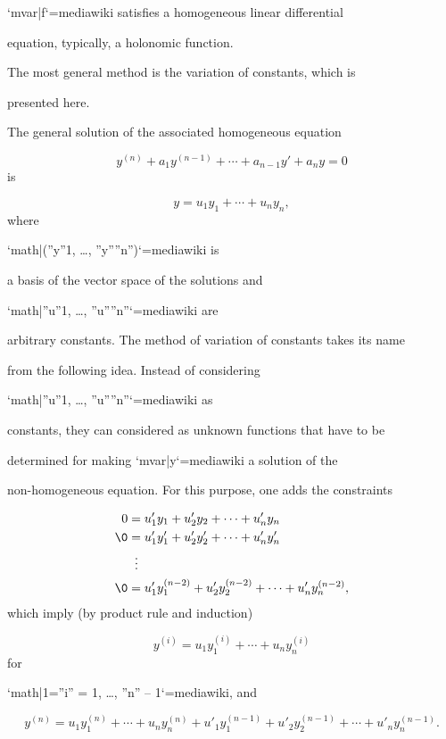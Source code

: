 `{{mvar|f}}`{=mediawiki} satisfies a homogeneous linear differential

equation, typically, a holonomic function.



The most general method is the variation of constants, which is

presented here.



The general solution of the associated homogeneous equation



$$y^{(n)} + a_1 y^{(n-1)} + \cdots + a_{n-1} y'+ a_ny = 0$$ is



$$y=u_1y_1+\cdots+ u_ny_n,$$ where

`{{math|(''y''1, …, ''y''''n'')}}`{=mediawiki} is

a basis of the vector space of the solutions and

`{{math|''u''1, …, ''u''''n''}}`{=mediawiki} are

arbitrary constants. The method of variation of constants takes its name

from the following idea. Instead of considering

`{{math|''u''1, …, ''u''''n''}}`{=mediawiki} as

constants, they can considered as unknown functions that have to be

determined for making `{{mvar|y}}`{=mediawiki} a solution of the

non-homogeneous equation. For this purpose, one adds the constraints



\begin{align}
0 &= u'_1y_1 + u'_2y_2 + \cdots+u'_ny_n \\\0 &= u'_1y'_1 + u'_2y'_2 + \cdots + u'_n y'_n \\\  & \; \;\vdots \\\0 &= u'_1y^{(n-2)}_1+u'_2y^{(n-2)}_2 + \cdots + u'_n y^{(n-2)}_n,
\end{align} which imply (by product rule and induction)



$$y^{(i)} = u_1 y_1^{(i)} + \cdots + u_n y_n^{(i)}$$ for

`{{math|1=''i'' = 1, …, ''n'' – 1}}`{=mediawiki}, and



$$y^{(n)} = u_1 y_1^{(n)} + \cdots + u_n y_n^{(n)} +u'_1y_1^{(n-1)}+u'_2y_2^{(n-1)}+\cdots+u'_ny_n^{(n-1)}.$$



